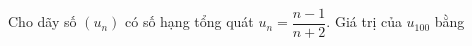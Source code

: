 \begin{ex}
Cho dãy số $(u_n)$ có số hạng tổng quát $u_n=\dfrac{n-1}{n+2}$. Giá trị của $u_{100}$ bằng
\end{ex}
